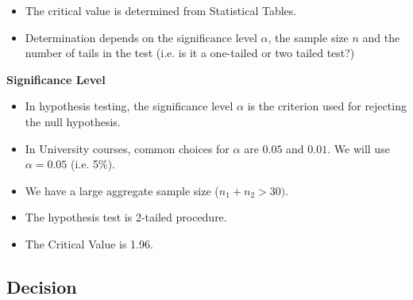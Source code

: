 \documentclass[a4paper,12pt]{article}
\begin{document}
\begin{itemize}
\item The critical value is determined from Statistical Tables.
\item Determination depends on the significance level $\alpha$, the sample size $n$ and the number of tails in the test (i.e. is it a one-tailed or two tailed test?)
\end{itemize}

\noindent \textbf{Significance Level}

\begin{itemize}
\item In hypothesis testing, the significance level $\alpha$ is the criterion used for rejecting the null hypothesis. 

\item In University courses, common choices for $\alpha$ are $0.05$ and $0.01$. We will use $\alpha =0.05$ (i.e. 5\%).
\item We have a large aggregate sample size ($n_1 + n_2 > 30)$.
\item The hypothesis test is 2-tailed procedure.
\item The Critical Value is 1.96.
\end{itemize}


\newpage 
\subsection*{Decision}
\end{document}
